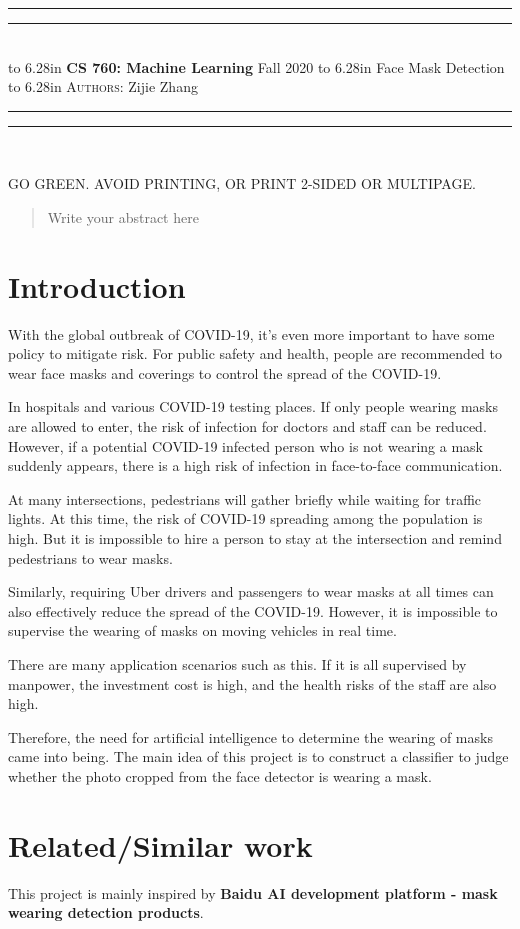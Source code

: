 \documentclass{article}
\newcommand{\lecture}[2]{
\pagestyle{myheadings}
\thispagestyle{plain}
\newpage
\noindent
\begin{center}
\rule{\textwidth}{1.6pt}\vspace*{-\baselineskip}\vspace*{2pt} %
\rule{\textwidth}{0.4pt}\\[1\baselineskip] %
\vbox{\vspace{2mm}
\hbox to 6.28in { {\bf CS 760: Machine Learning} \hfill Fall 2020 }
\vspace{4mm}
\hbox to 6.28in { {\Large \hfill #1  \hfill} }
\vspace{4mm}
\hbox to 6.28in { {\scshape Authors:}  #2 \hfill }}
\vspace{-2mm}
\rule{\textwidth}{0.4pt}\vspace*{-\baselineskip}\vspace{3.2pt} %
\rule{\textwidth}{1.6pt}\\[\baselineskip] %
\end{center}
\vspace*{4mm}
}
\begin{document}
\lecture{Face Mask Detection}{Zijie Zhang}

\begin{center}
{\Large {\sf GO GREEN. AVOID PRINTING, OR PRINT 2-SIDED OR MULTIPAGE.}}
\end{center}

\begin{abstract}
Write your abstract here
\end{abstract}

\section{Introduction}
With the global outbreak of COVID-19, it's even more important to have some policy to mitigate risk. For public safety and health, people are recommended to wear face masks and coverings to control the spread of the COVID-19.

In hospitals and various COVID-19 testing places. If only people wearing masks are allowed to enter, the risk of infection for doctors and staff can be reduced. However, if a potential COVID-19 infected person who is not wearing a mask suddenly appears, there is a high risk of infection in face-to-face communication.

At many intersections, pedestrians will gather briefly while waiting for traffic lights. At this time, the risk of COVID-19 spreading among the population is high. But it is impossible to hire a person to stay at the intersection and remind pedestrians to wear masks.

Similarly, requiring Uber drivers and passengers to wear masks at all times can also effectively reduce the spread of the COVID-19. However, it is impossible to supervise the wearing of masks on moving vehicles in real time.

There are many application scenarios such as this. If it is all supervised by manpower, the investment cost is high, and the health risks of the staff are also high.

Therefore, the need for artificial intelligence to determine the wearing of masks came into being. The main idea of this project is to construct a classifier to judge whether the photo cropped from the face detector is wearing a mask.

\section{Related/Similar work}
This project is mainly inspired by \textbf{Baidu AI development platform - mask wearing detection products}.
\end{document}
